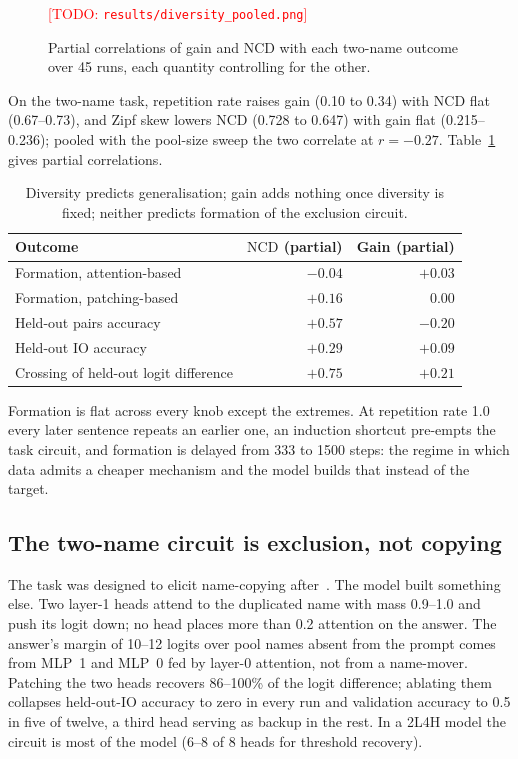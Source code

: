 \documentclass[11pt]{article}
\newcommand{\todo}[1]{\textcolor{red}{[TODO: #1]}}
\newcommand{\ncd}{\mathrm{NCD}}
\begin{document}
\begin{figure}[t]\centering
\todo{\texttt{results/diversity\_pooled.png}}
\caption{Partial correlations of gain and $\ncd$ with each two-name outcome
over 45 runs, each quantity controlling for the other.}
\label{fig:div}
\end{figure}

On the two-name task, repetition rate raises gain (0.10 to 0.34) with
$\ncd$ flat (0.67--0.73), and Zipf skew lowers $\ncd$ (0.728 to 0.647) with
gain flat (0.215--0.236); pooled with the pool-size sweep the two correlate
at $r=-0.27$. Table~\ref{tab:div} gives partial correlations.

\begin{table}[t]\centering\small
\begin{tabular}{lrr}\toprule
Outcome & $\ncd$ (partial) & Gain (partial) \\\midrule
Formation, attention-based & $-0.04$ & $+0.03$ \\
Formation, patching-based  & $+0.16$ & $\phantom{+}0.00$ \\
Held-out pairs accuracy    & $+0.57$ & $-0.20$ \\
Held-out IO accuracy       & $+0.29$ & $+0.09$ \\
Crossing of held-out logit difference & $+0.75$ & $+0.21$ \\\bottomrule
\end{tabular}
\caption{Diversity predicts generalisation; gain adds nothing once
diversity is fixed; neither predicts formation of the exclusion circuit.}
\label{tab:div}
\end{table}

Formation is flat across every knob except the extremes. At repetition
rate 1.0 every later sentence repeats an earlier one, an induction shortcut
pre-empts the task circuit, and formation is delayed from 333 to 1500
steps: the regime in which data admits a cheaper mechanism and the model
builds that instead of the target.

\subsection{The two-name circuit is exclusion, not copying}
\label{sec:twoname}

The task was designed to elicit name-copying after~\citet{wang2022ioi}. The
model built something else. Two layer-1 heads attend to the duplicated
name with mass 0.9--1.0 and push its logit down; no head places more than
0.2 attention on the answer. The answer's margin of 10--12 logits over
pool names absent from the prompt comes from MLP~1 and MLP~0 fed by
layer-0 attention, not from a name-mover. Patching the two heads recovers
86--100\% of the logit difference; ablating them collapses held-out-IO
accuracy to zero in every run and validation accuracy to 0.5 in five of
twelve, a third head serving as backup in the rest. In a 2L4H model the
circuit is most of the model (6--8 of 8 heads for threshold recovery).
\end{document}
